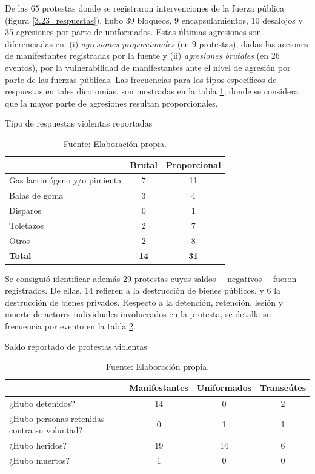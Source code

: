 \documentclass[letterpaper, 11pt]{book}
\theoremstyle{definition}
\theoremstyle{remark}
\begin{document}
De las 65 protestas donde se registraron intervenciones de la fuerza pública (figura \ref{3.23_respuestas}), hubo 39 bloqueos, 9 encapsulamientos, 10 desalojos y 35 agresiones por parte de uniformados. 
Estas últimas agresiones son diferenciadas en: (i) \emph{agresiones proporcionales} (en 9 protestas), dadas las acciones de manifestantes registradas por la fuente
y (ii) \emph{agresiones brutales} (en 26 eventos), por la vulnerabilidad de manifestantes ante el nivel de agresión por parte de las fuerzas públicas. 
Las frecuencias para los tipos específicos de respuestas en tales dicotomías, son mostradas en la tabla \ref{Tipo_respuestas_violentas},  
donde se considera que la mayor parte de agresiones resultan proporcionales. 


\begin{table}[H]
\small
\center
\caption{Tipo de respuestas violentas reportadas}
\label{Tipo_respuestas_violentas}
\begin{tabular}{ | l | c | c | }
\cline{2-3}
\multicolumn{1}{c|}{ } & \textbf{Brutal} & \textbf{Proporcional} \\
\hline
Gas lacrimógeno y/o pimienta & 7 & 11 \\
\hline
Balas de goma & 3 & 4 \\
\hline
Disparos & 0 & 1 \\
\hline
Toletazos & 2 & 7 \\
\hline
Otros & 2 & 8 \\
\hline
\textbf{Total} & \textbf{14} & \textbf{31}\\
\hline
\end{tabular}
\par\bigskip
\caption*{\small Fuente: Elaboración propia.}
\end{table}


Se consiguió identificar además 29 protestas cuyos saldos ---negativos---  fueron registrados. 
De ellas, 14 refieren a la destrucción de bienes públicos, y 6 la destrucción de bienes privados. 
Respecto a la detención, retención, lesión y muerte de actores individuales involucrados en la protesta, se detalla su frecuencia por evento en la tabla \ref{Saldo_violencia}. 


\begin{table}[H]
\small
\center
\caption{Saldo reportado de protestas violentas}
\label{Saldo_violencia}
\begin{tabular}{ | l | c | c | c | }
\cline{2-4}
\multicolumn{1}{c|}{ } & \textbf{Manifestantes} & \textbf{Uniformados} & \textbf{Transeútes} \\
\hline
¿Hubo detenidos? & 14 & 0 & 2\\
\hline
¿Hubo personas retenidas contra su voluntad? & 0 & 1 & 1\\
\hline
¿Hubo heridos? & 19 & 14 & 6\\
\hline
¿Hubo muertos? & 1 & 0 & 0\\
\hline
\end{tabular}
\par\bigskip
\caption*{\small Fuente: Elaboración propia.}
\end{table}
\end{document}
